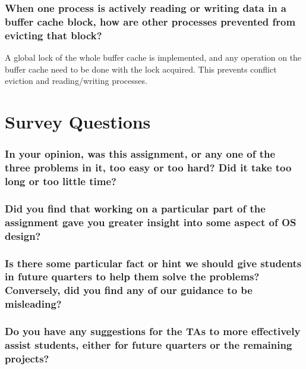 \documentclass[sigconf, nonacm, balance=false, urlbreakonhyphens=true]{acmart}
\begin{document}
            \subsubsection{When one process is actively reading or writing data in a buffer cache block, how are other processes prevented from evicting that block? }

                A global lock of the whole buffer cache is implemented, and any operation on the buffer cache need to be done with the lock acquired. This prevents conflict eviction and reading/writing processes. 

    \section{Survey Questions}


        \subsubsection*{In your opinion, was this assignment, or any one of the three problems in it, too easy or too hard? Did it take too long or too little time? }

        \subsubsection*{Did you find that working on a particular part of the assignment gave you greater insight into some aspect of OS design? }

        \subsubsection*{Is there some particular fact or hint we should give students in future quarters to help them solve the problems? Conversely, did you find any of our guidance to be misleading? }

        \subsubsection*{Do you have any suggestions for the TAs to more effectively assist students, either for future quarters or the remaining projects? }
\end{document}
